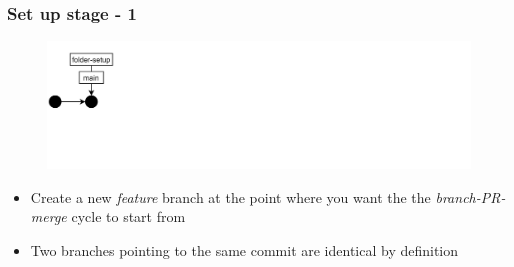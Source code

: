\documentclass[aspectratio=169]{beamer} %
\begin{document}
\begin{frame}
	\frametitle{Set up stage - 1}

	\vspace{-.5cm}
	\begin{minipage}[t][5cm][t]{\textwidth}
		\begin{figure}
			\centering
			\includegraphics[width=\textwidth]{./img/dime-gitflow-network-1-0.png}
		\end{figure}
	\end{minipage}

	\vspace{-.5cm}
	\begin{minipage}[t][5cm][t]{\textwidth}
		\begin{itemize}
			\setlength\itemsep{.5em}
			\item Create a new \textit{feature} branch at the point
			where you want the the \textit{branch-PR-merge} cycle
			to start from
			\item Two branches pointing to the same commit
			are identical by definition
		\end{itemize}
	\end{minipage}

\end{frame}
\end{document}
